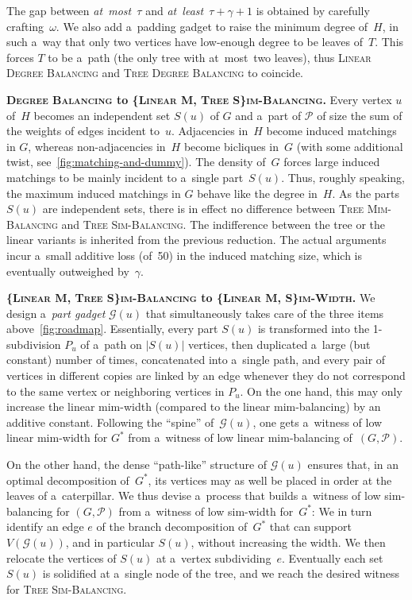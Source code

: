 \documentclass[a4paper,UKenglish,cleveref,hyperref,autoref]{lipics-v2021}
\newcommand{\weight}{\omega}
\newcommand{\ldb}{\textsc{Linear Degree Balancing}\xspace}
\newcommand{\tdb}{\textsc{Tree Degree Balancing}\xspace}
\newcommand{\tmb}{\textsc{Tree Mim-Balancing}\xspace}
\newcommand{\tsb}{\textsc{Tree Sim-Balancing}\xspace}
\begin{document}
The gap between \emph{at~most~$\tau$} and \emph{at~least~$\tau + \gamma +1$} is obtained by carefully crafting~$\weight$. 
We also add a~padding gadget to raise the minimum degree of~$H$, in such a~way that only two vertices have low-enough degree to be leaves of~$T$.
This forces $T$ to be a~path (the only tree with at~most~two leaves), thus \ldb and \tdb to coincide.

\medskip

\textbf{\textsc{Degree Balancing} to \textsc{\{Linear M, Tree S\}im-Balancing}.}
Every vertex $u$ of~$H$ becomes an independent set $S(u)$ of $G$ and a~part of $\mathcal P$ of size the sum of the weights of edges incident to~$u$.
Adjacencies in~$H$ become induced matchings in $G$, whereas non-adjacencies in~$H$ become bicliques in~$G$ (with some additional twist, see~\cref{fig:matching-and-dummy}).
The density of~$G$ forces large induced matchings to be mainly incident to a~single part~$S(u)$.
Thus, roughly speaking, the maximum induced matchings in $G$ behave like the degree in~$H$.
As the parts $S(u)$ are independent sets, there is in effect no difference between \tmb and \tsb.
The indifference between the tree or the linear variants is inherited from the previous reduction.
The actual arguments incur a~small additive loss (of~50) in the induced matching size, which is eventually outweighed by~$\gamma$.

\medskip

\textbf{\textsc{\{Linear M, Tree S\}im-Balancing} to \textsc{\{Linear M, S\}im-Width}.}
We design a~\emph{part gadget} $\mathcal G(u)$ that simultaneously takes care of the three items above~\cref{fig:roadmap}.
Essentially, every part $S(u)$ is transformed into the 1-subdivision $P_u$ of a~path on $|S(u)|$ vertices, then duplicated a~large (but constant) number of times, concatenated into a~single path, and every pair of vertices in different copies are linked by an edge whenever they do not correspond to the same vertex or neighboring vertices in $P_u$.
On the one hand, this may only increase the linear mim-width (compared to the linear mim-balancing) by an additive constant.
Following the ``spine'' of~$\mathcal G(u)$, one gets a~witness of low linear mim-width for $G^*$ from a~witness of low linear mim-balancing of~$(G,\mathcal P)$.

On the other hand, the dense ``path-like'' structure of $\mathcal G(u)$ ensures that, in an optimal decomposition of~$G^*$, its vertices may as well be placed in order at the leaves of a~caterpillar.
We thus devise a~process that builds a~witness of low sim-balancing for $(G,\mathcal P)$ from a~witness of low sim-width for~$G^*$:
We in turn identify an edge $e$ of the branch decomposition of~$G^*$ that can support $V(\mathcal G(u))$, and in particular $S(u)$, without increasing the width.
We then relocate the vertices of $S(u)$ at a~vertex subdividing~$e$.
Eventually each set $S(u)$ is solidified at a~single node of the tree, and we reach the desired witness for \tsb.
\end{document}
